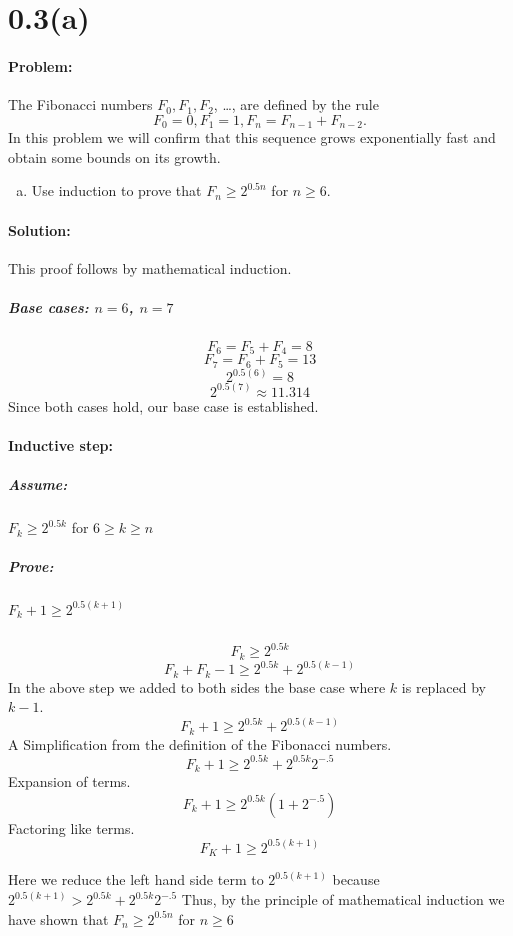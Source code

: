 \documentclass[12pt]{article}
\begin{document}
\section*{0.3(a)}
\paragraph{Problem:}
The Fibonacci numbers $F_0, F_1, F_2$, \ldots, are defined by the rule
\[ F_0 = 0, F_1 = 1, F_n = F_{n - 1} + F_{n - 2}. \]
In this problem we will confirm that this sequence grows exponentially
fast and obtain some
bounds on its growth.

\begin{enumerate}[(a)]
\item Use induction to prove that $F_n \geq 2^{0.5n}$ for $n \geq 6$.
\end{enumerate}

\paragraph{Solution:}
This proof follows by mathematical induction.

\subparagraph{Base cases: $n=6$, $n=7$}
$$F_6 = F_5 + F_4 = 8$$
$$F_7 = F_6 + F_5 = 13$$
$$2^{0.5(6)} = 8$$ 
$$2^{0.5(7)} \approx 11.314$$
Since both cases hold, our base case is established.

\paragraph{Inductive step:}

\subparagraph{Assume:}
$F_k \geq 2^{0.5k}$ for $6 \geq k \geq n$ \\

\subparagraph{Prove:}
$F_k+1 \geq 2^{0.5(k+1)}$

\subparagraph{}
$$F_k \geq 2^{0.5k}$$
$$F_k + F_k-1 \geq 2^{0.5k} + 2^{0.5(k-1)}$$
	In the above step we added to both sides the base case 
    where $k$ is replaced by $k-1$. 
$$F_k+1 \geq 2^{0.5k} + 2^{0.5(k-1)}$$
	A Simplification from the definition of the Fibonacci numbers.
$$F_k+1 \geq 2^{0.5k} + 2^{0.5k}2^{-.5}$$
	Expansion of terms.
$$F_k+1 \geq 2^{0.5k}(1 + 2^{-.5})$$ 
	Factoring like terms.
$$F_K+1 \geq 2^{0.5(k+1)}$$

Here we reduce the left hand side term to $2^{0.5(k+1)}$ because
$2^{0.5(k+1)} > 2^{0.5k}+2^{0.5k}2^{-.5}$ Thus, by the principle of
mathematical induction we have shown that $F_n \geq 2^{0.5n}$ for $n
\geq 6$ 
\end{document}
